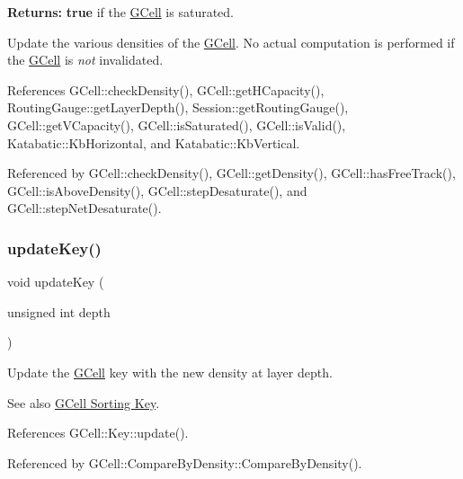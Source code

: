{\bfseries Returns\+:} {\bfseries true} if the \hyperlink{classKatabatic_1_1GCell}{G\+Cell} is saturated.

Update the various densities of the \hyperlink{classKatabatic_1_1GCell}{G\+Cell}. No actual computation is performed if the \hyperlink{classKatabatic_1_1GCell}{G\+Cell} is {\itshape not} invalidated. 

References G\+Cell\+::check\+Density(), G\+Cell\+::get\+H\+Capacity(), Routing\+Gauge\+::get\+Layer\+Depth(), Session\+::get\+Routing\+Gauge(), G\+Cell\+::get\+V\+Capacity(), G\+Cell\+::is\+Saturated(), G\+Cell\+::is\+Valid(), Katabatic\+::\+Kb\+Horizontal, and Katabatic\+::\+Kb\+Vertical.



Referenced by G\+Cell\+::check\+Density(), G\+Cell\+::get\+Density(), G\+Cell\+::has\+Free\+Track(), G\+Cell\+::is\+Above\+Density(), G\+Cell\+::step\+Desaturate(), and G\+Cell\+::step\+Net\+Desaturate().

\mbox{\label{classKatabatic_1_1GCell_a11beff0f0bec06d0f3e080969516dfc3}} 
\subsubsection{\texorpdfstring{update\+Key()}{updateKey()}}
{\footnotesize\ttfamily void update\+Key (\begin{DoxyParamCaption}\item[{unsigned int}]{depth }\end{DoxyParamCaption})\hspace{0.3cm}{\ttfamily [inline]}}

Update the \hyperlink{classKatabatic_1_1GCell}{G\+Cell} key with the new density at layer {\ttfamily depth}.

\begin{DoxySeeAlso}{See also}
\hyperlink{classKatabatic_1_1GCell_secGCellSortingKey}{G\+Cell Sorting Key}. 
\end{DoxySeeAlso}


References G\+Cell\+::\+Key\+::update().



Referenced by G\+Cell\+::\+Compare\+By\+Density\+::\+Compare\+By\+Density().

\mbox{\label{classKatabatic_1_1GCell_a11f07f57cc33fcd4b2d310145c778801}} 
